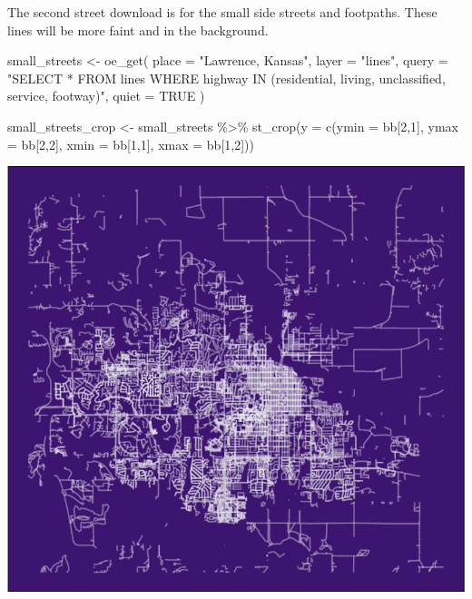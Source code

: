 \documentclass[
  paper=a4,
  ,captions=tableheading
]{scrartcl}
\newenvironment{Shaded}{\begin{snugshade}}{\end{snugshade}}
\newcommand{\AttributeTok}[1]{\textcolor[rgb]{0.77,0.63,0.00}{#1}}
\newcommand{\ConstantTok}[1]{\textcolor[rgb]{0.00,0.00,0.00}{#1}}
\newcommand{\DecValTok}[1]{\textcolor[rgb]{0.00,0.00,0.81}{#1}}
\newcommand{\FunctionTok}[1]{\textcolor[rgb]{0.00,0.00,0.00}{#1}}
\newcommand{\NormalTok}[1]{#1}
\newcommand{\OtherTok}[1]{\textcolor[rgb]{0.56,0.35,0.01}{#1}}
\newcommand{\SpecialCharTok}[1]{\textcolor[rgb]{0.00,0.00,0.00}{#1}}
\newcommand{\StringTok}[1]{\textcolor[rgb]{0.31,0.60,0.02}{#1}}
\begin{document}
The second street download is for the small side streets and footpaths.
These lines will be more faint and in the background.

\begin{Shaded}
\begin{Highlighting}[]
\NormalTok{small\_streets }\OtherTok{\textless{}{-}} \FunctionTok{oe\_get}\NormalTok{(}
  \AttributeTok{place =} \StringTok{"Lawrence, Kansas"}\NormalTok{, }
  \AttributeTok{layer =} \StringTok{"lines"}\NormalTok{,}
  \AttributeTok{query =} \StringTok{"SELECT * FROM lines WHERE highway IN (\textquotesingle{}residential\textquotesingle{}, \textquotesingle{}living\textquotesingle{},  \textquotesingle{}unclassified\textquotesingle{},  \textquotesingle{}service\textquotesingle{}, \textquotesingle{}footway\textquotesingle{})"}\NormalTok{,}
  \AttributeTok{quiet =} \ConstantTok{TRUE}
\NormalTok{)}

\NormalTok{small\_streets\_crop }\OtherTok{\textless{}{-}}\NormalTok{ small\_streets }\SpecialCharTok{\%\textgreater{}\%}
  \FunctionTok{st\_crop}\NormalTok{(}\AttributeTok{y =} \FunctionTok{c}\NormalTok{(}\AttributeTok{ymin =}\NormalTok{ bb[}\DecValTok{2}\NormalTok{,}\DecValTok{1}\NormalTok{], }\AttributeTok{ymax =}\NormalTok{ bb[}\DecValTok{2}\NormalTok{,}\DecValTok{2}\NormalTok{], }\AttributeTok{xmin =}\NormalTok{ bb[}\DecValTok{1}\NormalTok{,}\DecValTok{1}\NormalTok{], }\AttributeTok{xmax =}\NormalTok{ bb[}\DecValTok{1}\NormalTok{,}\DecValTok{2}\NormalTok{]))}
\end{Highlighting}
\end{Shaded}

\includegraphics{Haskell_files/figure-latex/unnamed-chunk-21-1.pdf}
\end{document}
